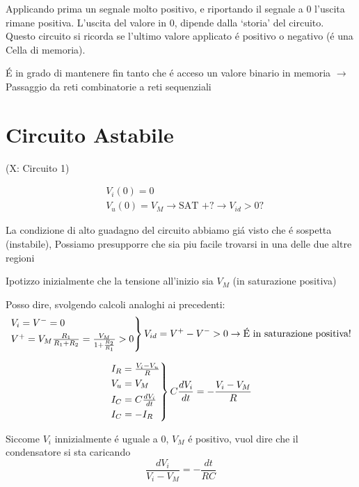 \documentclass{article}
\begin{document}
Applicando prima un segnale molto positivo, e riportando il segnale a 0 l'uscita rimane positiva. L'uscita del valore in 0, dipende dalla `storia' del circuito. Questo circuito si ricorda se l'ultimo valore applicato \'e positivo o negativo (\'e una Cella di memoria).

\'E in grado di mantenere fin tanto che \'e acceso un valore binario in memoria $\rightarrow$ Passaggio da reti combinatorie a reti sequenziali

\newpage
\section{Circuito Astabile}

\begin{circuitikz}

\end{circuitikz}
(X: Circuito 1)

\[
    \begin{split}
        &V_i(0) = 0\\
        &V_u(0) = V_M \rightarrow \text{SAT +?} \rightarrow V_{id} > 0 \text{?}
    \end{split}
\]

La condizione di alto guadagno del circuito abbiamo gi\'a visto che \'e sospetta (instabile), Possiamo presupporre che sia piu facile trovarsi in una delle due altre regioni

Ipotizzo inizialmente che la tensione all'inizio sia $V_M$ (in saturazione positiva)

Posso dire, svolgendo calcoli analoghi ai precedenti:
\[
    \begin{rcases}
        V_i = V^- = 0\\
        V^+ = V_M \frac{R_1}{R_1 + R_2} = \frac{V_M}{1 + \frac{R_2}{R_1}} > 0
    \end{rcases} V_{id} = V^+ - V^- > 0 \rightarrow \text{\'E in saturazione positiva!}
\]

\[
    \begin{rcases}
        I_R =\frac{V_i - V_u}{R}\\
        V_u = V_M\\
        I_C = C\frac{dV_i}{dt}\\
        I_C = - I_R
    \end{rcases}
    C \frac{dV_i}{dt} = - \frac{V_i - V_M}{R}
\]

Siccome $V_i$ innizialmente \'e uguale a 0, $V_M$ \'e positivo, vuol dire che il condensatore si sta caricando
\[
    \frac{dV_i}{V_i - V_M} = -\frac{dt}{RC}
\]
\end{document}
